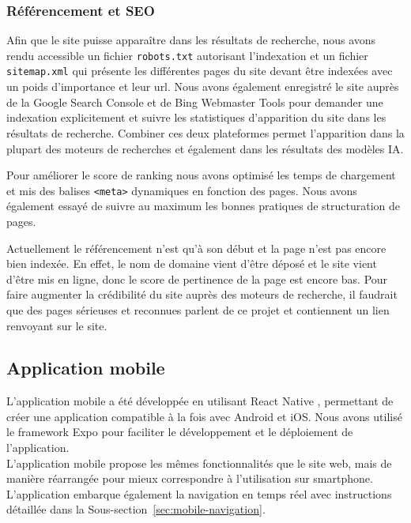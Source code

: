 \subsubsection{Référencement et SEO}
\noindent Afin que le site puisse apparaître dans les résultats de recherche, nous avons rendu accessible un fichier \texttt{robots.txt} autorisant l'indexation et un fichier \texttt{sitemap.xml} qui présente les différentes pages du site devant être indexées avec un poids d'importance et leur url.
Nous avons également enregistré le site auprès de la Google Search Console \cite{GoogleSearchConsole} et de Bing Webmaster Tools \cite{BingWebmasterTools} pour demander une indexation explicitement et suivre les statistiques d'apparition du site dans les résultats de recherche.
Combiner ces deux plateformes permet l'apparition dans la plupart des moteurs de recherches et également dans les résultats des modèles IA.

\noindent Pour améliorer le score de ranking nous avons optimisé les temps de chargement et mis des balises \texttt{<meta>} dynamiques en fonction des pages. Nous avons également essayé de suivre au maximum les bonnes pratiques de structuration de pages.

\noindent Actuellement le référencement n'est qu'à son début et la page n'est pas encore bien indexée. En effet, le nom de domaine vient d'être déposé et le site vient d'être mis en ligne, donc le score de pertinence de la page est encore bas. Pour faire augmenter la crédibilité du site auprès des moteurs de recherche, il faudrait que des pages sérieuses et reconnues parlent de ce projet et contiennent un lien renvoyant sur le site.

\subsection{Application mobile}
\label{sec:mobile}

\noindent L'application mobile a été développée en utilisant React Native \cite{ReactNative}, permettant de créer une application compatible à la fois avec Android et iOS. Nous avons utilisé le framework Expo \cite{Expo} pour faciliter le développement et le déploiement de l'application.\\

\noindent L'application mobile propose les mêmes fonctionnalités que le site web, mais de manière réarrangée pour mieux correspondre à l'utilisation sur smartphone. L'application embarque également la navigation en temps réel avec instructions détaillée dans la Sous-section~\ref{sec:mobile-navigation}.


